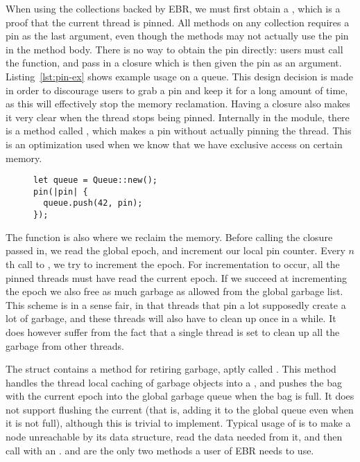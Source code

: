 \documentclass[b5paper]{report}
\begin{document}
When using the collections backed by EBR, we must first obtain a ,
which is a proof that the current thread is pinned. All methods on any
collection requires a pin as the last argument, even though the methods may not
actually use the pin in the method body. There is no way to obtain the pin
directly: users must call the  function, and pass in a closure which
is then given the pin as an argument. Listing~\ref{lst:pin-ex} shows example
usage on a queue. This design decision is made in order to discourage users to
grab a pin and keep it for a long amount of time, as this will effectively stop
the memory reclamation. Having a closure also makes it very clear when the
thread stops being pinned. Internally in the  module, there is a
method called , which makes a pin without actually pinning the
thread. This is an optimization used when we know that we have exclusive access
on certain memory.

\begin{figure}[ht!]
\begin{lstlisting}[caption=Example usage of the \code{pin} fucntion,
label=lst:pin-ex,numbers=none]
let queue = Queue::new();
pin(|pin| {
  queue.push(42, pin);
});
\end{lstlisting}
\end{figure}

The  function is also where we reclaim the memory. Before calling the
closure passed in, we read the global epoch, and increment our local pin
counter. Every $n$th call to , we try to increment the epoch. For
incrementation to occur, all the pinned threads must have read the current
epoch.  If we succeed at incrementing the epoch we also free as much garbage as
allowed from the global garbage list. This scheme is in a sense fair, in that
threads that pin a lot supposedly create a lot of garbage, and these threads
will also have to clean up once in a while. It does however suffer from the fact
that a single thread is set to clean up all the garbage from other threads.

The  struct contains a method for retiring garbage, aptly called
. This method handles the thread local caching of garbage
objects into a , and pushes the bag with the current epoch into the
global garbage queue when the bag is full. It does not support flushing the
current  (that is, adding it to the global queue even when it is not
full), although this is trivial to implement.  Typical usage of  is to make a
node unreachable by its data structure, read the data needed from it, and then
call  with an .   and
 are the only two methods a user of EBR needs to use.
\end{document}
